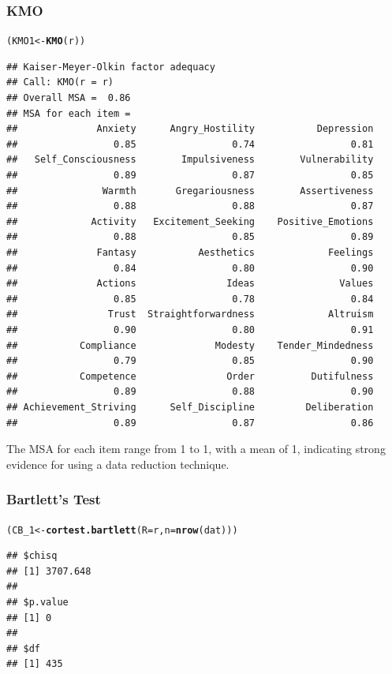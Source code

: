 \documentclass{article}\usepackage[]{graphicx}\usepackage[]{color}
\makeatletter
\newcommand{\hlstd}[1]{\textcolor[rgb]{0.345,0.345,0.345}{#1}}%
\newcommand{\hlkwb}[1]{\textcolor[rgb]{0.69,0.353,0.396}{#1}}%
\newcommand{\hlkwc}[1]{\textcolor[rgb]{0.333,0.667,0.333}{#1}}%
\newcommand{\hlkwd}[1]{\textcolor[rgb]{0.737,0.353,0.396}{\textbf{#1}}}%
\newenvironment{kframe}{%
 \def\at@end@of@kframe{}%
 \ifinner\ifhmode%
  \def\at@end@of@kframe{\end{minipage}}%
  \begin{minipage}{\columnwidth}%
 \fi\fi%
 \def\FrameCommand##1{\hskip\@totalleftmargin \hskip-\fboxsep
 \colorbox{shadecolor}{##1}\hskip-\fboxsep
     \hskip-\linewidth \hskip-\@totalleftmargin \hskip\columnwidth}%
 \MakeFramed {\advance\hsize-\width
   \@totalleftmargin\z@ \linewidth\hsize
   \@setminipage}}%
 {\par\unskip\endMakeFramed%
 \at@end@of@kframe}
\newenvironment{knitrout}{}{} %
\makeatother
\begin{document}
\subsubsection{KMO}
\begin{knitrout}
\color{fgcolor}\begin{kframe}
\begin{alltt}
\hlstd{(KMO1} \hlkwb{<-} \hlkwd{KMO}\hlstd{(r))}
\end{alltt}
\begin{verbatim}
## Kaiser-Meyer-Olkin factor adequacy
## Call: KMO(r = r)
## Overall MSA =  0.86
## MSA for each item = 
##              Anxiety      Angry_Hostility           Depression 
##                 0.85                 0.74                 0.81 
##   Self_Consciousness        Impulsiveness        Vulnerability 
##                 0.89                 0.87                 0.85 
##               Warmth       Gregariousness        Assertiveness 
##                 0.88                 0.88                 0.87 
##             Activity   Excitement_Seeking    Positive_Emotions 
##                 0.88                 0.85                 0.89 
##              Fantasy           Aesthetics             Feelings 
##                 0.84                 0.80                 0.90 
##              Actions                Ideas               Values 
##                 0.85                 0.78                 0.84 
##                Trust  Straightforwardness             Altruism 
##                 0.90                 0.80                 0.91 
##           Compliance              Modesty    Tender_Mindedness 
##                 0.79                 0.85                 0.90 
##           Competence                Order          Dutifulness 
##                 0.89                 0.88                 0.90 
## Achievement_Striving      Self_Discipline         Deliberation 
##                 0.89                 0.87                 0.86
\end{verbatim}
\end{kframe}
\end{knitrout}

The MSA for each item range from 1 to 1, with a mean of 1, indicating strong evidence for using a data reduction technique. 

\subsubsection{Bartlett's Test}
\begin{knitrout}
\color{fgcolor}\begin{kframe}
\begin{alltt}
\hlstd{(CB_1} \hlkwb{<-} \hlkwd{cortest.bartlett}\hlstd{(}\hlkwc{R}\hlstd{=r,}\hlkwc{n}\hlstd{=}\hlkwd{nrow}\hlstd{(dat)))}
\end{alltt}
\begin{verbatim}
## $chisq
## [1] 3707.648
## 
## $p.value
## [1] 0
## 
## $df
## [1] 435
\end{verbatim}
\end{kframe}
\end{knitrout}
\end{document}
